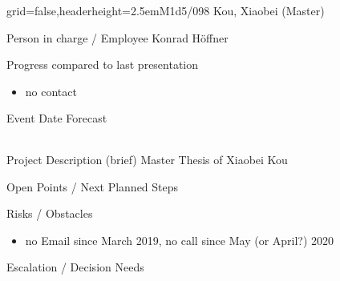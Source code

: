 \documentclass[english]{kiesgrube}
\begin{document}
\begin{poster}{grid=false,headerheight=2.5em}{}{M1d5/098 Kou, Xiaobei (Master)}{}{}
\begin{posterbox}[name=person,column=0,row=0]{Person in charge / Employee}
Konrad Höffner
\end{posterbox}
\begin{posterbox}[name=progress,below=person]{Progress compared to last presentation}
\small
\begin{itemize}
\item no contact
\end{itemize}
\end{posterbox}
\begin{posterbox}[name=event,below=progress]{Event Date Forecast}
\begin{tabulary}{\textwidth}{lL}
\end{tabulary}
\end{posterbox}
\begin{posterbox}[name=description,column=1,row=0]{Project Description (brief)}
Master Thesis of Xiaobei Kou
\end{posterbox}
\begin{posterbox}[name=open,column=1,below=description]{Open Points / Next Planned Steps}
\end{posterbox}
\begin{posterbox}[name=risks,column=1,below=open]{Risks / Obstacles}
\begin{itemize}
\item no Email since March 2019, no call since May (or April?) 2020
\end{itemize}
\end{posterbox}
\begin{posterbox}[name=escalation,column=1,below=risks]{Escalation / Decision Needs}

\end{posterbox}
\end{poster}
\end{document}
